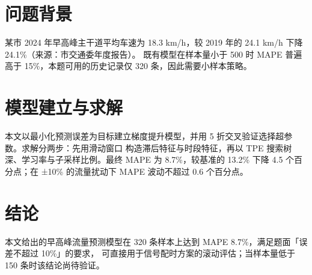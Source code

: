
\section{问题背景}

某市 2024 年早高峰主干道平均车速为 18.3 km/h，较 2019 年的 24.1 km/h 下降 24.1\%（来源：市交通委年度报告）。
既有模型在样本量小于 500 时 MAPE 普遍高于 15\%，本题可用的历史记录仅 320 条，因此需要小样本策略。

\section{模型建立与求解}

本文以最小化预测误差为目标建立梯度提升模型，并用 5 折交叉验证选择超参数。求解分两步：先用滑动窗口
构造滞后特征与时段特征，再以 TPE 搜索树深、学习率与子采样比例。最终 MAPE 为 8.7\%，较基准的 13.2\%
下降 4.5 个百分点；在 ±10\% 的流量扰动下 MAPE 波动不超过 0.6 个百分点。

\section{结论}

本文给出的早高峰流量预测模型在 320 条样本上达到 MAPE 8.7\%，满足题面「误差不超过 10\%」的要求，
可直接用于信号配时方案的滚动评估；当样本量低于 150 条时该结论尚待验证。
